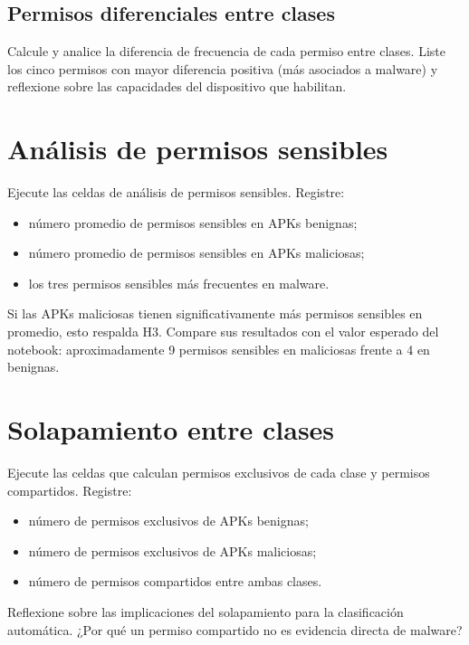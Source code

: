 \documentclass[
  coursetitle={Cómputo Nube y Tecnologías Emergentes},
  coursehours={96},
  coursedate={Verano 2026},
  doctype={Taller},
  otherlangs={english,french},
  authorname={Lázaro},
  authorsurname={Bustio-Martínez},
  authortitle={PhD},
  role={Profesor Investigador},
  email={lbustio@inaoe.mx},
  phone={5559504000},
  ext={7459},
  institution={Instituto Nacional de Astrofísica, Óptica y Electrónica (INAOE)},
  department={Maestría en Ciencias en Tecnologías de Seguridad},
  address={Luis Enrique Erro 1, Sta. Ma. Tonantzintla, San Andrés Cholula, CP 72840, Puebla, México},
  margin={0.5in}
]{../../lbustio_lecture_notes}
\begin{document}
\subsection{Permisos diferenciales entre clases}

Calcule y analice la diferencia de frecuencia de cada permiso entre clases. Liste los cinco permisos con mayor diferencia positiva (más asociados a malware) y reflexione sobre las capacidades del dispositivo que habilitan.

\section{Análisis de permisos sensibles}

Ejecute las celdas de análisis de permisos sensibles. Registre:

\begin{itemize}
    \item número promedio de permisos sensibles en APKs benignas;
    \item número promedio de permisos sensibles en APKs maliciosas;
    \item los tres permisos sensibles más frecuentes en malware.
\end{itemize}

\begin{tcolorbox}[title=Evidencia para H3]
Si las APKs maliciosas tienen significativamente más permisos sensibles en promedio, esto respalda H3. Compare sus resultados con el valor esperado del notebook: aproximadamente 9 permisos sensibles en maliciosas frente a 4 en benignas.
\end{tcolorbox}

\section{Solapamiento entre clases}

Ejecute las celdas que calculan permisos exclusivos de cada clase y permisos compartidos. Registre:

\begin{itemize}
    \item número de permisos exclusivos de APKs benignas;
    \item número de permisos exclusivos de APKs maliciosas;
    \item número de permisos compartidos entre ambas clases.
\end{itemize}

Reflexione sobre las implicaciones del solapamiento para la clasificación automática. ¿Por qué un permiso compartido no es evidencia directa de malware?
\end{document}
